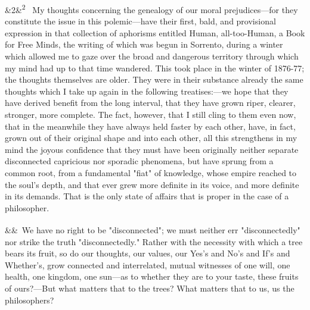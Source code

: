 \documentclass[12pt]{article}
\newcommand{\para}[1][]{\par\noindent\ifx&#1&\else\textsuperscript{\footnotesize #1}~\fi}
\begin{document}
\para[2] My thoughts concerning the genealogy of our moral prejudices---for they constitute the issue in this polemic---have their first, bald, and provisional expression in that collection of aphorisms entitled Human, all-too-Human, a Book for Free Minds, the writing of which was begun in Sorrento, during a winter which allowed me to gaze over the broad and dangerous territory through which my mind had up to that time wandered. This took place in the winter of 1876-77; the thoughts themselves are older. They were in their substance already the same thoughts which I take up again in the following treatises:---we hope that they have derived benefit from the long interval, that they have grown riper, clearer, stronger, more complete. The fact, however, that I still cling to them even now, that in the meanwhile they have always held faster by each other, have, in fact, grown out of their original shape and into each other, all this strengthens in my mind the joyous confidence that they must have been originally neither separate disconnected capricious nor sporadic phenomena, but have sprung from a common root, from a fundamental "fiat" of knowledge, whose empire reached to the soul's depth, and that ever grew more definite in its voice, and more definite in its demands. That is the only state of affairs that is proper in the case of a philosopher.

\para We have no right to be "disconnected"; we must neither err "disconnectedly" nor strike the truth "disconnectedly." Rather with the necessity with which a tree bears its fruit, so do our thoughts, our values, our Yes's and No's and If's and Whether's, grow connected and interrelated, mutual witnesses of one will, one health, one kingdom, one sun---as to whether they are to your taste, these fruits of ours?---But what matters that to the trees? What matters that to us, us the philosophers?
\end{document}
